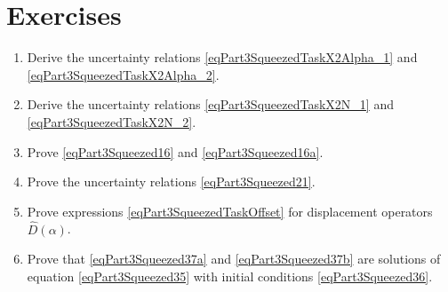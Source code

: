 \section{Exercises}
\begin{enumerate}
\item Derive the uncertainty relations
  \eqref{eqPart3SqueezedTaskX2Alpha_1} and
  \eqref{eqPart3SqueezedTaskX2Alpha_2}.
\item Derive the uncertainty relations
  \eqref{eqPart3SqueezedTaskX2N_1} and
  \eqref{eqPart3SqueezedTaskX2N_2}.
\item Prove \eqref{eqPart3Squeezed16} and
  \eqref{eqPart3Squeezed16a}. 
\item Prove the uncertainty relations
  \eqref{eqPart3Squeezed21}. 
\item Prove expressions \eqref{eqPart3SqueezedTaskOffset} for
  displacement operators $\hat{D}\left(\alpha\right)$.
\item Prove that \eqref{eqPart3Squeezed37a} and
  \eqref{eqPart3Squeezed37b} are solutions 
  of equation \eqref{eqPart3Squeezed35} with initial
  conditions \eqref{eqPart3Squeezed36}.
\end{enumerate}